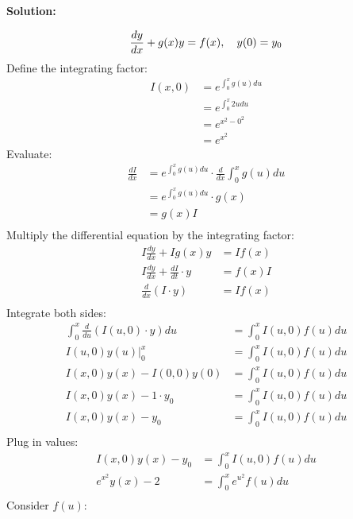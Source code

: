 \documentclass[12pt]{article}
\newenvironment{solution}{
    \textbf{Solution:}
    
}{
    
    \vspace{2em}
}
\begin{document}
\begin{solution}
    \[
        \frac{dy}{dx}+g(x)y=f(x),\quad y(0)=y_0\\
    \]
Define the integrating factor:
    \[
        \begin{aligned}
            I(x,0)&=e^{\int_{0}^x g(u)du}\\
            &=e^{\int_{0}^x 2udu}\\
            &=e^{x^2-0^2} \\
            &=e^{x^2}
        \end{aligned}
    \]
Evaluate:
    \[
        \begin{aligned} 
            \frac{dI}{dx} &= e^{\int_{0}^xg(u)du} \cdot \frac{d}{dx}\int_{0}^{x}g(u)du\\
            &= e^{\int_{0}^x g(u)du}\cdot g(x)\\
            &= g(x)I\\
        \end{aligned}
    \]
Multiply the differential equation by the integrating factor:
    \[
        \begin{aligned}
            I\frac{dy}{dx}+Ig(x)y &= If(x)\\
            I\frac{dy}{dx} + \frac{dI}{dt} \cdot y &= f(x)I\\
            \frac{d}{dx}(I\cdot y) &= If(x)\\
        \end{aligned}
    \]
Integrate both sides:
    \[
        \begin{aligned}
            \int_{0}^x \frac{d}{du}(I(u,0)\cdot y)du &= \int_{0}^x I(u,0)f(u)du\\
            I(u,0)y(u)\Big|_{0}^x &= \int_{0}^x I(u,0)f(u)du\\
            I(x,0)y(x)-I(0,0)y(0) &= \int_{0}^x I(u,0)f(u)du\\
            I(x,0)y(x)- 1 \cdot y_0 &= \int_{0}^x I(u,0)f(u)du\\
            I(x,0)y(x)- y_0 &= \int_{0}^x I(u,0)f(u)du\\
        \end{aligned}
    \]
Plug in values:
    \[
        \begin{aligned}
            I(x,0)y(x)- y_0 &= \int_{0}^x I(u,0)f(u)du\\
            e^{x^2}y(x)- 2 &= \int_{0}^x e^{u^2} f(u)du\\
        \end{aligned}
    \]  
Consider \(f(u)\):
    \[
        \begin{aligned}

\end{aligned}\]
\end{solution}
\end{document}
